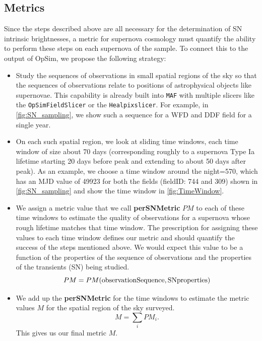 
\subsection{Metrics}
\label{sec:\secname:metrics}


Since the steps described above are all necessary for the determination of
SN intrinsic brightnesses, a metric for supernova cosmology must
quantify the ability to perform these steps on each supernova of the
sample. To connect this to the output of OpSim, we propose the
following strategy:
\begin{itemize}
    \item Study the sequences of observations in small spatial regions
    of the sky so that the sequences of observations relate to positions
    of astrophysical objects like supernovae. This capability is already
    built into \texttt{MAF} with multiple slicers like the
    \texttt{OpSimFieldSlicer} or the \texttt{Healpixslicer}. For example, in
    \autoref{fig:SN_sampling}, we show such a sequence for a WFD and
    DDF field for a single year.
    \item On each such spatial region, we look at sliding time windows,
    each time window of size about 70 days (corresponding roughly to a
    supernova Type Ia  lifetime starting 20 days before peak and
    extending to about 50 days after peak). As an example, we choose a
    time window around the night=570, which has an MJD value of 49923
    for both the fields (fieldID: 744 and 309) shown in
    \autoref{fig:SN_sampling} and show the time window in
    \autoref{fig:TimeWindow}.
    \item  We assign a metric value that we call \textbf{perSNMetric}
    $PM$ to each of these time windows to estimate the quality of
    observations for a supernova whose rough lifetime matches that time
    window. The prescription for assigning these values to each
    time window defines our metric and should quantify the success of
    the steps mentioned above. We would expect this value to be a
    function of the properties of the sequence of observations and the
    properties of the transients (SN) being studied. $$ PM =
    PM(\rm{observation Sequence, SN properties})$$
    \item We add up the \textbf{perSNMetric} for the time windows to
    estimate the metric values $M$ for the spatial region of the sky
    surveyed. $$M = \sum_i PM_i. $$ This gives us our final metric $M$.
\end{itemize}

